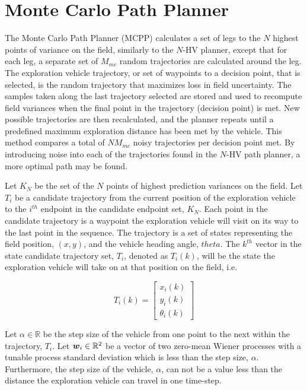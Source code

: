 \section{Monte Carlo Path Planner} \label{sec:mcpp}
The Monte Carlo Path Planner (MCPP) calculates a set of legs to the $N$ highest points of variance on the field, similarly to the $N$-HV planner, except that for each leg, a separate set of $M_{mc}$ random trajectories are calculated around the leg. The exploration vehicle trajectory, or set of waypoints to a decision point, that is selected, is the random trajectory that maximizes loss in field uncertainty. The samples taken along the last trajectory selected are stored and used to recompute field variances when the final point in the trajectory (decision point) is met. New possible trajectories are then recalculated, and the planner repeats until a predefined maximum exploration distance has been met by the vehicle. This method compares a total of $N M_{mc}$ noisy trajectories per decision point met. By introducing noise into each of the trajectories found in the $N$-HV path planner, a more optimal path may be found.

Let $K_N$ be the set of the $N$ points of highest prediction variances on the field. Let $T_i$ be a candidate trajectory from the current position of the exploration vehicle to the $i^{th}$ endpoint in the candidate endpoint set, $K_N$. Each point in the candidate trajectory is a waypoint the exploration vehicle will visit on its way to the last point in the sequence. The trajectory is a set of states representing the field position, $(x,y)$, and the vehicle heading angle, $theta$. The $k^{th}$ vector in the state candidate trajectory set, $T_i$, denoted as $T_{i}(k)$, will be the state the exploration vehicle will take on at that position on the field, i.e.

\begin{equation}
T_{i}(k) = \begin{bmatrix} x_i(k) \\ y_i(k) \\ \theta_i(k) \end{bmatrix}
\end{equation}

Let $\alpha \in \mathbb{R}$ be the step size of the vehicle from one point to the next within the trajectory, $T_i$. Let ${\it{\boldsymbol{w}}}_i \in \mathbb{R}^2$ be a vector of two zero-mean Wiener processes with a tunable process standard deviation which is less than the step size, $\alpha$. Furthermore, the step size of the vehicle, $\alpha$, can not be a value less than the distance the exploration vehicle can travel in one time-step.

